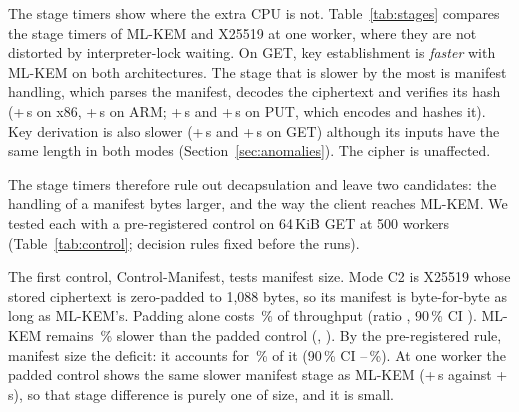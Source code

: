 \documentclass[review,12pt]{elsarticle}
\newcommand{\lab}[1]{\textsf{#1}}
\begin{document}
\begin{table}[!htbp]
\caption{CPU accounting on 64\,KiB GET: the inverse ratio of client CPU per request (column ``Implied by CPU'', computed from the same runs, so not a prediction in the statistical sense) against the observed throughput ratio to X25519 (\lab{Primary-x86} and \lab{Primary-ARM})}
\label{tab:model}
\centering\footnotesize
\setlength{\tabcolsep}{3pt}
\end{table}

The stage timers show where the extra CPU is not. Table~\ref{tab:stages} compares the stage timers of ML-KEM
and X25519 at one worker, where they are not distorted by interpreter-lock waiting. On GET, key
establishment is \emph{faster} with ML-KEM on both architectures. The stage that is slower by
the most is manifest handling, which parses the manifest, decodes the ciphertext and verifies
its hash (+\RevGetStageManifestDelta\,\textmu s on x86, +\ArmGetStageManifestDelta\,\textmu s on
ARM; +\RevPutStageManifestDelta\,\textmu s and +\ArmPutStageManifestDelta\,\textmu s on PUT,
which encodes and hashes it). Key derivation is also slower
(+\RevGetStageKdfDelta\,\textmu s and +\ArmGetStageKdfDelta\,\textmu s on GET) although its
inputs have the same length in both modes (Section~\ref{sec:anomalies}). The cipher is
unaffected.

\begin{table}[!htbp]
\caption{ML-KEM-768 minus X25519 at one worker, 64\,KiB objects (\lab{Hybrid-Matrix} and \lab{OneWorker-ARM}, five runs): difference in mean stage time, and in client CPU per request with its 95\,\% interval}
\label{tab:stages}
\centering\footnotesize
\setlength{\tabcolsep}{4pt}
\end{table}

The stage timers therefore rule out decapsulation and leave two candidates: the handling of a
manifest \RevMetaExtraMLKEM{} bytes larger, and the way the client reaches ML-KEM. We tested
each with a pre-registered control on 64\,KiB GET at 500 workers
(Table~\ref{tab:control}; decision rules fixed before the runs).

The first control, \lab{Control-Manifest}, tests manifest size. Mode C2 is X25519 whose stored ciphertext is
zero-padded to 1{,}088 bytes, so its manifest is byte-for-byte as long as ML-KEM's. Padding
alone costs \AudPadCost\,\% of throughput (ratio \AudPadRatio, 90\,\% CI \AudPadCI). ML-KEM
remains \AudRestCost\,\% slower than the padded control (\AudRestRatio, \AudRestCI). By the
pre-registered rule, manifest size \emph{\AudPadVerdict} the deficit: it accounts for
\AudPadShare\,\% of it (90\,\% CI \AudPadShareLo--\AudPadShareHi\,\%). At one worker the padded
control shows the same slower manifest stage as ML-KEM (+\AudPadStageGet\,\textmu s against
+\AudMlkemStageGet\,\textmu s), so that stage difference is purely one of size, and it is
small.
\end{document}
